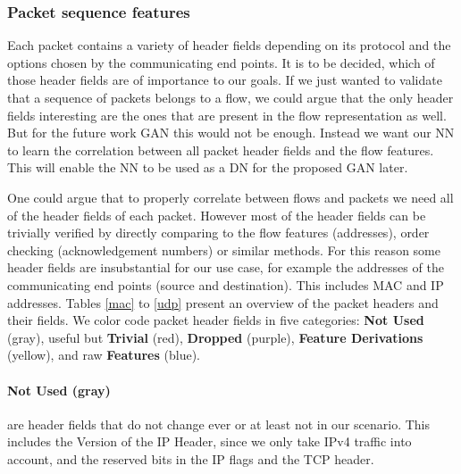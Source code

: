 \documentclass[
	ngerman,
	ruledheaders=section,%
	class=report,%
	thesis={type=bachelor},%
	accentcolor=9c,%
	custommargins=true,%
	marginpar=false,%
	parskip=half-,%
	fontsize=11pt,%
]{tudapub}
\begin{document}
\subsubsection{Packet sequence features}


Each packet contains a variety of header fields depending on its protocol and the options chosen by the communicating end points.
It is to be decided, which of those header fields are of importance to our goals.
If we just wanted to validate that a sequence of packets belongs to a flow, we could argue that the only header fields interesting are the ones that are present in the flow representation as well.
But for the future work GAN this would not be enough.
Instead we want our NN to learn the correlation between all packet header fields and the flow features.
This will enable the NN to be used as a DN for the proposed GAN later.

One could argue that to properly correlate between flows and packets we need all of the header fields of each packet.
However most of the header fields can be trivially verified by directly comparing to the flow features (addresses), order checking (acknowledgement numbers) or similar methods.
For this reason some header fields are insubstantial for our use case, for example the addresses of the communicating end points (source and destination).
This includes MAC and IP addresses.
Tables \ref{mac} to \ref{udp} present an overview of the packet headers and their fields.
We color code packet header fields in five categories:
\colorbox{not}{\textbf{{Not Used}} (gray)},
useful but \colorbox{trivial}{\textbf{Trivial} (red)},
\colorbox{dropped}{\textbf{Dropped} (purple)},
\colorbox{derivation}{\textbf{Feature Derivations} (yellow)},
and raw \colorbox{feature}{\textbf{Features} (blue)}.

\paragraph{\colorbox{not}{\textbf{{Not Used} (gray)}}} are header fields that do not change ever or at least not in our scenario.
This includes the Version of the IP Header, since we only take IPv4 traffic into account,
and the reserved bits in the IP flags and the TCP header.
\end{document}
